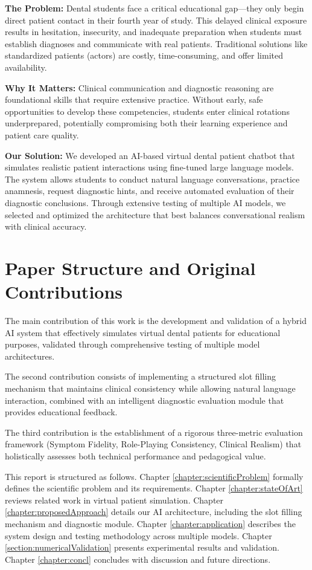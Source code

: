 \documentclass[runningheads,a4paper,11pt]{report}
\begin{document}
\textbf{The Problem:} Dental students face a critical educational gap—they only begin direct patient contact in their fourth year of study. This delayed clinical exposure results in hesitation, insecurity, and inadequate preparation when students must establish diagnoses and communicate with real patients. Traditional solutions like standardized patients (actors) are costly, time-consuming, and offer limited availability.

\textbf{Why It Matters:} Clinical communication and diagnostic reasoning are foundational skills that require extensive practice. Without early, safe opportunities to develop these competencies, students enter clinical rotations underprepared, potentially compromising both their learning experience and patient care quality.

\textbf{Our Solution:} We developed an AI-based virtual dental patient chatbot that simulates realistic patient interactions using fine-tuned large language models. The system allows students to conduct natural language conversations, practice anamnesis, request diagnostic hints, and receive automated evaluation of their diagnostic conclusions. Through extensive testing of multiple AI models, we selected and optimized the architecture that best balances conversational realism with clinical accuracy.

\section{Paper Structure and Original Contributions}
\label{section:structure}

The main contribution of this work is the development and validation of a hybrid AI system that effectively simulates virtual dental patients for educational purposes, validated through comprehensive testing of multiple model architectures.

The second contribution consists of implementing a structured slot filling mechanism that maintains clinical consistency while allowing natural language interaction, combined with an intelligent diagnostic evaluation module that provides educational feedback.

The third contribution is the establishment of a rigorous three-metric evaluation framework (Symptom Fidelity, Role-Playing Consistency, Clinical Realism) that holistically assesses both technical performance and pedagogical value.

This report is structured as follows. Chapter \ref{chapter:scientificProblem} formally defines the scientific problem and its requirements. Chapter \ref{chapter:stateOfArt} reviews related work in virtual patient simulation. Chapter \ref{chapter:proposedApproach} details our AI architecture, including the slot filling mechanism and diagnostic module. Chapter \ref{chapter:application} describes the system design and testing methodology across multiple models. Chapter \ref{section:numericalValidation} presents experimental results and validation. Chapter \ref{chapter:concl} concludes with discussion and future directions.
\end{document}
